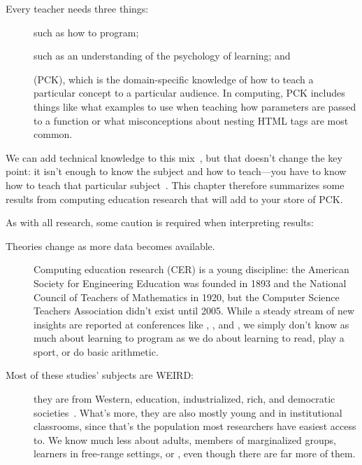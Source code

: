 
Every teacher needs three things:

\begin{description}

\item[]
  such as how to program;

\item[]
  such as an understanding of the psychology of learning;
  and

\item[]
  (PCK),
  which is the domain-specific knowledge of
  how to teach a particular concept to a particular audience.
  In computing,
  PCK includes things like what examples to use when teaching how parameters are passed to a function
  or what misconceptions about nesting HTML tags are most common.

\end{description}

We can add technical knowledge to this mix~\cite{Koeh2013},
but that doesn't change the key point:
it isn't enough to know the subject and how to teach---you have to know
how to teach that particular subject~\cite{Maye2004}.
This chapter therefore summarizes some results from computing education research
that will add to your store of PCK.

As with all research,
some caution is required when interpreting results:

\begin{description}

\item[Theories change as more data becomes available.]
  Computing education research (CER) is a young discipline:
  the American Society for Engineering Education was founded in 1893
  and the National Council of Teachers of Mathematics in 1920,
  but the Computer Science Teachers Association didn't exist until 2005.
  While a steady stream of new insights are reported at conferences like ,
  ,
  and ,
  we simply don't know as much about learning to program
  as we do about learning to read,
  play a sport,
  or do basic arithmetic.

\item[Most of these studies' subjects are WEIRD:]
  they are from Western, education, industrialized, rich, and democratic societies~\cite{Henr2010}.
  What's more,
  they are also mostly young and in institutional classrooms,
  since that's the population most researchers have easiest access to.
  We know much less about adults,
  members of marginalized groups,
  learners in free-range settings,
  or ,
  even though there are far more of them.

\end{description}

